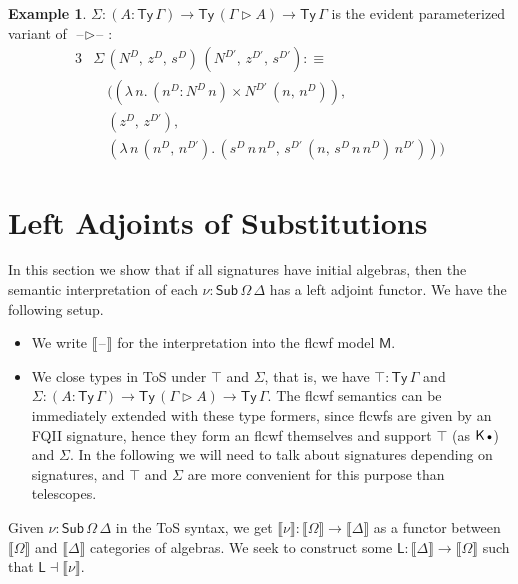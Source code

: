 \documentclass[12pt,a4paper,twoside,openany]{book}
\theoremstyle{remark}
\theoremstyle{definition}
\newtheorem{myexample}{Example}
\theoremstyle{theorem}
\newcommand{\ms}[1]{\mathsf{#1}}
\newcommand{\bs}[1]{\boldsymbol{#1}}
\newcommand{\Sub}{\mathsf{Sub}}
\newcommand{\Ty}{\mathsf{Ty}}
\newcommand{\blank}{\mathord{\hspace{1pt}\text{--}\hspace{1pt}}}
\newcommand{\ext}{\triangleright}
\newcommand{\emptycon}{\scaleobj{.75}\bullet}
\newcommand{\K}{\mathsf{K}}
\newcommand{\bM}{\bs{\mathsf{M}}}
\newcommand{\llb}{\llbracket}
\newcommand{\rrb}{\rrbracket}
\newcommand{\sem}[1]{\llb#1\rrb}
\newcommand{\defn}{:\equiv}
\begin{document}
\begin{myexample}
$\Sigma : (A : \Ty\,\Gamma) \to \Ty\,(\Gamma \ext A) \to \Ty\,\Gamma$ is the
evident parameterized variant of $\blank\ext\blank$:
\begin{alignat*}{3}
  &\Sigma\,(N^D,\,z^D,\,s^D)\,(N^{D'},\,z^{D'},\,s^{D'}) \defn\\
  & \hspace{1em}((\lambda\,n.\,(n^D : N^D\,n) \times N^{D'}\,(n,\,n^D)),\,\\
  & \hspace{1em}(z^D,\,z^{D'}),\,\\
  & \hspace{1em}(\lambda\,n\,(n^D,\,n^{D'}).\,(s^D\,n\,n^D,\,s^{D'}\,(n,\,s^D\,n\,n^D)\,n^{D'})))
\end{alignat*}
\end{myexample}

\section{Left Adjoints of Substitutions}
\label{sec:fqii-left-adjoint}

In this section we show that if all signatures have initial algebras, then the
semantic interpretation of each $\nu : \Sub\,\Omega\,\Delta$ has a left adjoint
functor. We have the following setup.
\begin{itemize}
  \item
  We write $\llb\blank\rrb$ for the interpretation into the flcwf model $\bM$.
  \item
  We close types in ToS under $\top$ and $\Sigma$, that is, we have $\top :
  \Ty\,\Gamma$ and $\Sigma : (A : \Ty\,\Gamma) \to \Ty\,(\Gamma \ext A) \to
  \Ty\,\Gamma$. The flcwf semantics can be immediately extended with these type
  formers, since flcwfs are given by an FQII signature, hence they form an flcwf
  themselves and support $\top$ (as $\K\,\emptycon$) and $\Sigma$. In the
  following we will need to talk about signatures depending on signatures, and
  $\top$ and $\Sigma$ are more convenient for this purpose than telescopes.
\end{itemize}

Given $\nu : \Sub\,\Omega\,\Delta$ in the ToS syntax, we get $\sem{\nu} :
\sem{\Omega} \to \sem{\Delta}$ as a functor between $\sem{\Omega}$ and
$\sem{\Delta}$ categories of algebras. We seek to construct some $\ms{L} :
\sem{\Delta} \to \sem{\Omega}$ such that $\ms{L} \dashv \sem{\nu}$.
\end{document}
